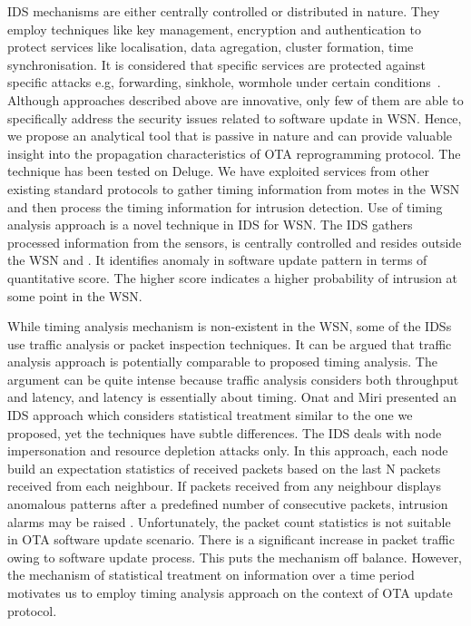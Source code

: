 \documentclass[conference,manuscript]{IEEEtran}
\begin{document}
IDS mechanisms are either centrally controlled or distributed in nature.
They employ techniques like key management, encryption and authentication to protect services like localisation, data agregation, cluster formation, time synchronisation.
It is considered that specific services are protected against specific attacks e.g, forwarding, sinkhole, wormhole under certain conditions~\cite{1639675, 6096939, sink08, 5172466}.
Although approaches described above are innovative, only few of them are able to specifically address the security issues related to software update in WSN.
Hence, we propose an analytical tool that is passive in nature and can provide valuable insight into the propagation characteristics of OTA reprogramming protocol. 
The technique has been tested on Deluge.
We have exploited services from other existing standard protocols to gather timing information from motes in  the WSN and then process the timing information for intrusion detection.
Use of timing analysis approach is a novel technique in IDS for WSN.
The IDS  gathers processed information from the sensors, is centrally controlled and resides outside the WSN and .
It  identifies anomaly in software update pattern in terms of quantitative score. 
The higher score indicates a higher probability of intrusion at some point in the WSN. 

While timing analysis mechanism is non-existent in the WSN, some of the IDSs use traffic analysis or packet inspection  techniques.
It can be argued that traffic analysis approach is potentially comparable to proposed timing analysis.
The argument can be quite intense because traffic analysis considers both throughput and latency, and latency is essentially about timing.
Onat and Miri presented an IDS approach which considers statistical treatment similar to the one we proposed, yet the techniques have subtle differences.
The IDS deals with node impersonation and resource depletion attacks only.
In this approach, each node build an expectation statistics of received packets based on the last N packets received from each neighbour.
If packets received from any neighbour displays anomalous patterns after a predefined number of consecutive packets, intrusion alarms may be raised \cite{1512911}.
Unfortunately, the  packet count statistics is not suitable in OTA software update scenario.
There is a significant increase in packet traffic owing to software update process. 
This puts the mechanism off balance.
However, the mechanism of statistical treatment on information over a time period motivates us to employ timing analysis approach on the context of OTA update protocol.
\end{document}
